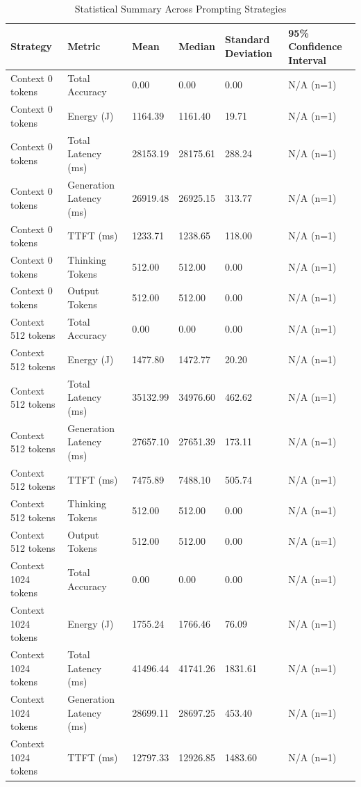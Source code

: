 \begin{table}
\caption{Statistical Summary Across Prompting Strategies}
\label{tab:statistical_summary}
\begin{tabular}{llllll}
\toprule
Strategy & Metric & Mean & Median & Standard Deviation & 95\% Confidence Interval \\
\midrule
Context 0 tokens & Total Accuracy & 0.00 & 0.00 & 0.00 & N/A (n=1) \\
Context 0 tokens & Energy (J) & 1164.39 & 1161.40 & 19.71 & N/A (n=1) \\
Context 0 tokens & Total Latency (ms) & 28153.19 & 28175.61 & 288.24 & N/A (n=1) \\
Context 0 tokens & Generation Latency (ms) & 26919.48 & 26925.15 & 313.77 & N/A (n=1) \\
Context 0 tokens & TTFT (ms) & 1233.71 & 1238.65 & 118.00 & N/A (n=1) \\
Context 0 tokens & Thinking Tokens & 512.00 & 512.00 & 0.00 & N/A (n=1) \\
Context 0 tokens & Output Tokens & 512.00 & 512.00 & 0.00 & N/A (n=1) \\
Context 512 tokens & Total Accuracy & 0.00 & 0.00 & 0.00 & N/A (n=1) \\
Context 512 tokens & Energy (J) & 1477.80 & 1472.77 & 20.20 & N/A (n=1) \\
Context 512 tokens & Total Latency (ms) & 35132.99 & 34976.60 & 462.62 & N/A (n=1) \\
Context 512 tokens & Generation Latency (ms) & 27657.10 & 27651.39 & 173.11 & N/A (n=1) \\
Context 512 tokens & TTFT (ms) & 7475.89 & 7488.10 & 505.74 & N/A (n=1) \\
Context 512 tokens & Thinking Tokens & 512.00 & 512.00 & 0.00 & N/A (n=1) \\
Context 512 tokens & Output Tokens & 512.00 & 512.00 & 0.00 & N/A (n=1) \\
Context 1024 tokens & Total Accuracy & 0.00 & 0.00 & 0.00 & N/A (n=1) \\
Context 1024 tokens & Energy (J) & 1755.24 & 1766.46 & 76.09 & N/A (n=1) \\
Context 1024 tokens & Total Latency (ms) & 41496.44 & 41741.26 & 1831.61 & N/A (n=1) \\
Context 1024 tokens & Generation Latency (ms) & 28699.11 & 28697.25 & 453.40 & N/A (n=1) \\
Context 1024 tokens & TTFT (ms) & 12797.33 & 12926.85 & 1483.60 & N/A (n=1) \\

\end{tabular}
\end{table}
